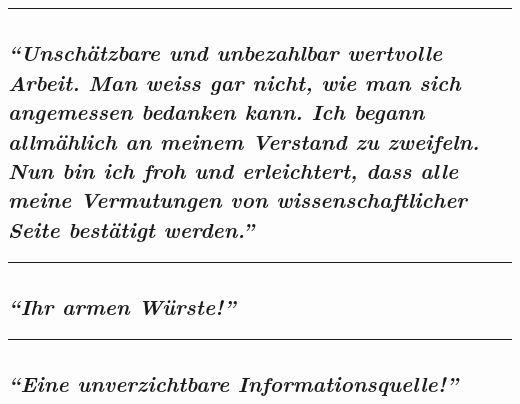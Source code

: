 \begin{center}\rule{0.5\linewidth}{\linethickness}\end{center}

\hypertarget{unschuxe4tzbare-und-unbezahlbar-wertvolle-arbeit-man-weiss-gar-nicht-wie-man-sich-angemessen-bedanken-kann-ich-begann-allmuxe4hlich-an-meinem-verstand-zu-zweifeln-nun-bin-ich-froh-und-erleichtert-dass-alle-meine-vermutungen-von-wissenschaftlicher-seite-bestuxe4tigt-werden}{%
\subsection{\texorpdfstring{\emph{``Unschätzbare und unbezahlbar
wertvolle Arbeit. Man weiss gar nicht, wie man sich angemessen bedanken
kann. Ich begann allmählich an meinem Verstand zu zweifeln. Nun bin ich
froh und erleichtert, dass alle meine Ver­mu­tungen von
wissenschaftlicher Seite bestätigt
werden.''}}{``Unschätzbare und unbezahlbar wertvolle Arbeit. Man weiss gar nicht, wie man sich angemessen bedanken kann. Ich begann allmählich an meinem Verstand zu zweifeln. Nun bin ich froh und erleichtert, dass alle meine Ver­mu­tungen von wissenschaftlicher Seite bestätigt werden.''}}\label{unschuxe4tzbare-und-unbezahlbar-wertvolle-arbeit-man-weiss-gar-nicht-wie-man-sich-angemessen-bedanken-kann-ich-begann-allmuxe4hlich-an-meinem-verstand-zu-zweifeln-nun-bin-ich-froh-und-erleichtert-dass-alle-meine-vermutungen-von-wissenschaftlicher-seite-bestuxe4tigt-werden}}

\begin{center}\rule{0.5\linewidth}{\linethickness}\end{center}

\hypertarget{ihr-armen-wuxfcrste}{%
\subsection{\texorpdfstring{\emph{``Ihr armen
Würste!''}}{``Ihr armen Würste!''}}\label{ihr-armen-wuxfcrste}}

\begin{center}\rule{0.5\linewidth}{\linethickness}\end{center}

\hypertarget{eine-unverzichtbare-informationsquelle}{%
\subsection{\texorpdfstring{\emph{``Eine unverzichtbare
Informationsquelle!''}}{``Eine unverzichtbare Informationsquelle!''}}\label{eine-unverzichtbare-informationsquelle}}

